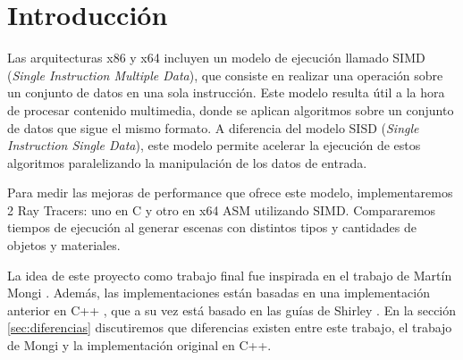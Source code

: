 \section{Introducción} \label{sec:introduccion}

Las arquitecturas x86 y x64 incluyen un modelo de ejecución llamado SIMD
(\textit{Single Instruction Multiple Data}), que consiste en realizar una
operación sobre un conjunto de datos en una sola instrucción. Este modelo
resulta útil a la hora de procesar contenido multimedia, donde se aplican
algoritmos sobre un conjunto de datos que sigue el mismo formato. A diferencia
del modelo SISD (\textit{Single Instruction Single Data}), este modelo permite
acelerar la ejecución de estos algoritmos paralelizando la manipulación de los
datos de entrada.

Para medir las mejoras de performance que ofrece este modelo, implementaremos 2
Ray Tracers: uno en C y otro en x64 ASM utilizando SIMD. Compararemos tiempos de
ejecución al generar escenas con distintos tipos y cantidades de objetos y
materiales.

La idea de este proyecto como trabajo final fue inspirada en el trabajo de
Martín Mongi \cite{rtmartin}. Además, las implementaciones están basadas en una
implementación anterior en C++ \cite{RayTracerCpp}, que a su vez está basado en
las guías de Shirley \cite{RTIOW}. En la sección \ref{sec:diferencias}
discutiremos que diferencias existen entre este trabajo, el trabajo de Mongi y
la implementación original en C++.

